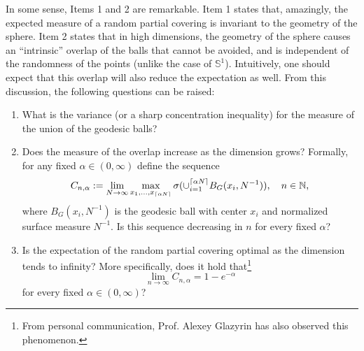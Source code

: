 In some sense, Items 1 and 2 are remarkable. Item 1 states that, amazingly, the expected measure of a random partial covering is invariant to the geometry of the sphere. Item 2 states that in high dimensions, the geometry of the sphere causes an ``intrinsic'' overlap of the balls that cannot be avoided, and is independent of the randomness of the points (unlike the case of $\mathbb{S}^{1}$).  Intuitively, one should expect that this overlap will also reduce the expectation as well. From this discussion, the following questions can be raised:

\begin{enumerate}
	\item What is the variance (or a sharp concentration inequality) for the measure of the union of the geodesic balls?
	\item Does the measure of the overlap increase as the dimension grows? Formally, for any fixed $\alpha \in (0,\infty)$ define the sequence   
	\[
C_{n,\alpha}:=\lim_{N\to\infty}\max_{x_1,\ldots,x_{\lceil \alpha N \rceil}}\sigma(\cup_{i=1}^{\lceil \alpha N \rceil}B_G(x_i,N^{-1})), \quad n\in\Bbb N,
	\]
	where $B_G(x_i,N^{-1})$ is the geodesic ball with center $x_i$ and normalized surface measure $N^{-1}$. Is this sequence decreasing in $n$ for every fixed $\alpha$?
\item Is the expectation of the random partial covering optimal as the dimension tends to infinity? More specifically, does it hold that\footnote{From personal communication, Prof. Alexey Glazyrin has also observed this phenomenon.}
\[
\lim_{n \to \infty}C_{n,\alpha} = 1-e^{-\alpha}
\]	
for every fixed $\alpha \in (0,\infty)$?
	
\end{enumerate} 
